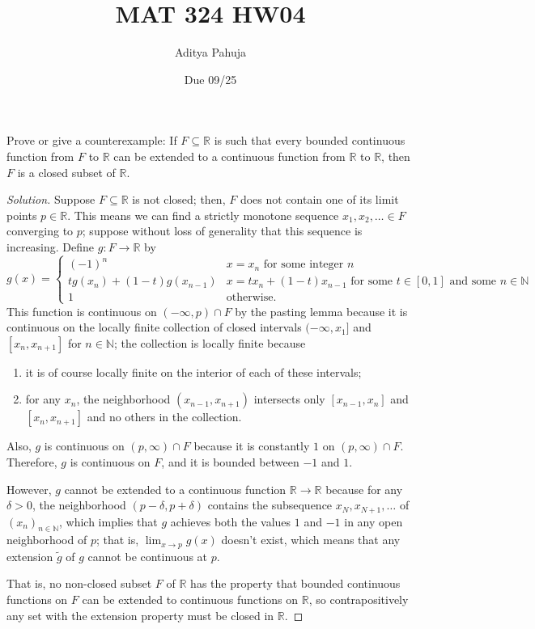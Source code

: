 \documentclass[10pt]{article}
\title{MAT 324 HW04}
\author{\large Aditya Pahuja}
\date{\large Due 09/25}
\providecommand{\NN}{\mathbb N}
\providecommand{\RR}{\mathbb R}
\providecommand{\ii}{\item}
\newenvironment{soln}{\begin{proof}[Solution]}{\end{proof}}
\begin{document}
\maketitle

\begin{problem}
    Prove or give a counterexample:
    If $F\subseteq\RR$ is such that every bounded continuous function
    from $F$ to $\RR$ can be extended to a continuous function
    from $\RR$ to $\RR$, then $F$ is a closed subset of $\RR$.
\end{problem}

\begin{soln}
    Suppose $F\subseteq\RR$ is not closed; then, $F$ does not contain
    one of its limit points $p\in\RR$. This means we can find
    a strictly monotone sequence $x_1,x_2,\dots\in F$ converging to $p$;
    suppose without loss of generality that this sequence is increasing.
    Define $g\colon F\to\RR$ by
    \begin{equation*}
        g(x) = \begin{cases}
	    (-1)^n & x = x_n\text{ for some integer }n\\
	    tg(x_n) + (1-t)g(x_{n-1}) &
	    x = tx_n + (1-t)x_{n-1}\text{ for some }t\in[0,1]
	    \text{ and some }n\in\NN\\
	    1 & \text{otherwise}.
        \end{cases}
    \end{equation*}
    This function is continuous on $(-\infty,p)\cap F$ by the pasting lemma because
    it is continuous on the locally finite collection of closed intervals
    $(-\infty,x_1]$ and $[x_n,x_{n+1}]$ for $n\in\NN$;
    the collection is locally finite because
    \begin{enumerate}[(1)]
        \ii it is of course locally finite on the interior of each of these intervals;
	\ii for any $x_n$, the neighborhood $(x_{n-1},x_{n+1})$
	intersects only $[x_{n-1},x_n]$ and $[x_n,x_{n+1}]$
	and no others in the collection.
    \end{enumerate}
    Also, $g$ is continuous on $(p,\infty)\cap F$ because it is constantly $1$
    on $(p,\infty)\cap F$. Therefore, $g$ is continuous on $F$,
    and it is bounded between $-1$ and $1$.

    However, $g$ cannot be extended to a continuous function $\RR\to\RR$
    because for any $\delta>0$, the neighborhood
    $(p-\delta,p+\delta)$ contains the subsequence $x_N,x_{N+1},\dots$
    of $(x_n)_{n\in\NN}$, which implies that $g$ achieves
    both the values $1$ and $-1$ in any open neighborhood of $p$;
    that is, $\lim_{x\to p} g(x)$ doesn't exist, which means that
    any extension $\widetilde g$ of $g$ cannot be continuous at $p$.

    That is, no non-closed subset $F$ of $\RR$ has the property that
    bounded continuous functions on $F$ can be extended to
    continuous functions on $\RR$, so contrapositively
    any set with the extension property must be closed in $\RR$.
\end{soln}
\end{document}
